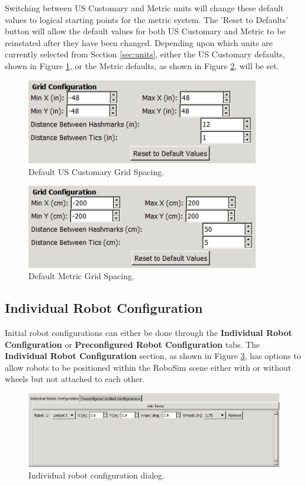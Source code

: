 \documentclass{article}
\begin{document}
Switching between US Customary and Metric units will change these default values
to logical starting points for the metric system.  The 'Reset to Defaults' button
will allow the default values for both US Customary and Metric to be reinstated
after they have been changed.  Depending upon which units are currently selected
from Section \ref{sec:units}, either the US Customary defaults, shown in Figure
\ref{fig:grid_us}, or the Metric defaults, as shown in Figure
\ref{fig:grid_metric}, will be set.
\begin{figure}[H]
	\begin{center}
		\includegraphics[width=4in]{images/gui_grid_us}
	\end{center}
	\caption{Default US Customary Grid Spacing.}
	\label{fig:grid_us}
\end{figure}
\begin{figure}[H]
	\begin{center}
		\includegraphics[width=4in]{images/gui_grid_si}
	\end{center}
	\caption{Default Metric Grid Spacing.}
	\label{fig:grid_metric}
\end{figure}

\subsection{Individual Robot Configuration}
Initial robot configurations can either be done through the {\bf Individual
Robot Configuration} or {\bf Preconfigured Robot Configuration} tabs.  The
{\bf Individual Robot Configuration} section, as shown in Figure
\ref{fig:config}, has options to allow robots to be positioned within the
RoboSim scene either with or without wheels but not attached to each other.
\begin{figure}[H]
	\begin{center}
		\includegraphics[width=6in]{images/gui_individual}
	\end{center}
	\caption{Individual robot configuration dialog.}
	\label{fig:config}
\end{figure}
\end{document}
